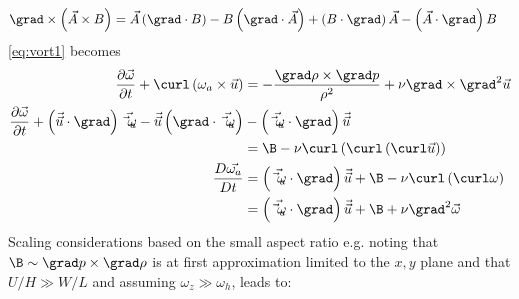 \begin{derivation}[Vorticity]
\begin{equation}
\begin{split}
	\grad \times \left( \vec{A} \times B \right)
	&=
	\vec{A} \left( \grad \cdot B \right)
	-
	B \left( \grad \cdot \vec{A} \right)
	+
	\left( B \cdot \grad \right) \vec{A}
	-
	\left( \vec{A} \cdot \grad \right) B
	\end{split}\end{equation}
	\eqref{eq:vort1} becomes
	\begin{equation}\begin{split}
	\frac{\partial \vec{\omega}}{\partial t}
	+
	\curl \left( \omega_{a} \times \vec{u} \right)
	&=
	-\frac{\grad \rho \times \grad p	}{\rho^{2}}
	+
	\nu \grad \times \grad^{2} \vec{u}\\
	\frac{\partial \vec{\omega}}{\partial t}
	+
	\left( \vec{\vec{u}} \cdot \grad \right) \vec{\vec{\omega}_{a}}
	-
	\vec{\vec{u}} \left( \grad \cdot \vec{\vec{\omega}_{a}} \right)
	&-
	\left( \vec{\vec{\omega}_{a}} \cdot \grad \right) \vec{\vec{u}}\\
	&=
	\B
	-
	\nu \curl \left( \curl \left( \curl \vec{u} \right) \right)\\
	\frac{D \vec{\omega_{a}}}{D t}
	&=
	\left( \vec{\vec{\omega}_{a}} \cdot \grad \right) \vec{\vec{u}}
	+
	\B
	-
	\nu \curl \left( \curl \omega \right)\\
	&=
	\left( \vec{\vec{\omega}_{a}} \cdot \grad \right) \vec{\vec{u}}
	+
	\B
	+
	\nu \grad^2 \vec{\omega}
	\end{split}\end{equation}
	Scaling considerations based on the small aspect ratio e.g. noting that
	$\B \sim \grad p \times \grad \rho$ is at first approximation
	limited to	the $x,y$ plane and that $U/H \gg W/L$ and assuming $\omega_z
	\gg	\omega_h $,	leads to:


\end{derivation}
